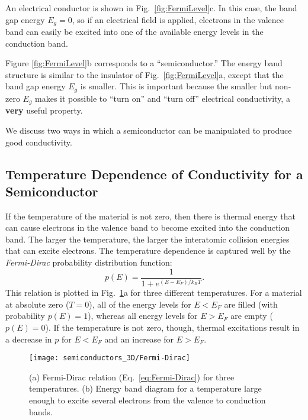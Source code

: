 An electrical conductor is shown in Fig.~\ref{fig:FermiLevel}c. In this
case, the band gap energy $E_g = 0$, so if an electrical field is applied, electrons
in the valence band can easily be excited into one of the available energy
levels in the conduction band.

Figure \ref{fig:FermiLevel}b corresponds to a ``semiconductor.'' The
energy band structure is similar to the insulator of Fig.~\ref{fig:FermiLevel}a,
except that the band gap energy $E_g$ is smaller. This is important because
the smaller but non-zero $E_g$ makes it possible to ``turn on'' and ``turn off''
electrical conductivity, a {\bf very} useful property.

We discuss two ways in which a semiconductor can be manipulated to
produce good conductivity.

\subsection{Temperature Dependence of Conductivity for a Semiconductor}

If the temperature of the material is not zero, then there is
thermal energy that can cause electrons in the valence band to 
become excited into the conduction band. The larger the temperature,
the larger the interatomic collision energies that can excite electrons.
The temperature dependence is captured well by the {\it Fermi-Dirac}
probability distribution function:
\begin{equation}
p(E) = \frac{1}{1+e^{(E-E_F)/k_BT}} .
\label{eq:Fermi-Dirac}
\end{equation}
This relation is plotted in Fig.~\ref{fig:Fermi-Dirac}a for three
different temperatures.  For a material at absolute zero ($T = 0$), all
of the energy levels for $E < E_F$ are filled (with probability $p(E) = 1$),
whereas all energy levels for $E > E_F$ are empty ($p(E) = 0$).
If the temperature is not zero, though, thermal excitations result in
a decrease in $p$ for $E < E_F$ and an increase for $E > E_F$.

\begin{figure}
\begin{center}
\texttt{[image: semiconductors\_3D/Fermi-Dirac]}
\end{center} 
\caption{(a) Fermi-Dirac relation (Eq.~\ref{eq:Fermi-Dirac}) for
three temperatures. (b) Energy band diagram for a temperature large
enough to excite several electrons from the valence to conduction bands.} 
\label{fig:Fermi-Dirac} 
\end{figure}

